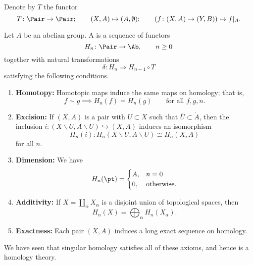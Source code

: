 \documentclass[main.tex]{subfiles}
\begin{document}
Denote by $T$ the functor
\begin{equation*}
  T\colon \Pair \to \Pair;\qquad (X, A) \mapsto (A,\emptyset);\qquad (f\colon (X, A) \to (Y, B)) \mapsto f|_{A}.
\end{equation*}

\begin{definition}
  \label{def:homology_theory}
  Let $A$ be an abelian group. A  is a sequence of functors
  \begin{equation*}
    H_{n}\colon \Pair \to \Ab,\qquad n \geq 0
  \end{equation*}
  together with natural transformations
  \begin{equation*}
    \delta\colon H_{n} \Rightarrow H_{n-1} \circ T
  \end{equation*}
  satisfying the following conditions.
  \begin{enumerate}
    \item \textbf{Homotopy:} Homotopic maps induce the same maps on homology; that is,
      \begin{equation*}
        f \sim g \implies H_{n}(f) = H_{n}(g) \qquad\text{for all } f, g, n.
      \end{equation*}

    \item \textbf{Excision:} If $(X, A)$ is a pair with $U \subset X$ such that $\bar{U} \subset \mathring{A}$, then the inclusion $i\colon (X\smallsetminus U, A \smallsetminus U) \hookrightarrow (X, A)$ induces an isomorphism
      \begin{equation*}
        H_{n}(i)\colon H_{n}(X\smallsetminus U, A\smallsetminus U) \cong H_{n}(X, A)
      \end{equation*}
      for all $n$.

    \item \textbf{Dimension:} We have
      \begin{equation*}
        H_{n}(\pt) =
        \begin{cases}
          A, &n = 0 \\
          0, &\text{otherwise}.
        \end{cases}
      \end{equation*}

    \item \textbf{Additivity:} If $X = \coprod_{\alpha} X_{\alpha}$ is a disjoint union of topological spaces, then
      \begin{equation*}
        H_{n}(X) = \bigoplus_{\alpha} H_{n}(X_{\alpha}).
      \end{equation*}

    \item \textbf{Exactness:} Each pair $(X, A)$ induces a long exact sequence on homology.
  \end{enumerate}
\end{definition}

We have seen that singular homology satisfies all of these axioms, and hence is a homology theory.
\end{document}
